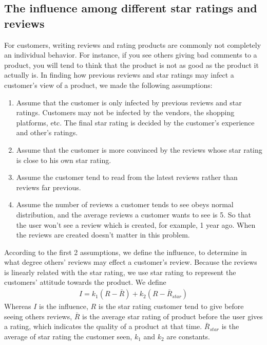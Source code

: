 \documentclass[12pt]{article}  %
\begin{document}
\subsection{The influence among different star ratings and reviews}
\label{sec:The influence among different star ratings and reviews}

For customers, writing reviews and rating products are commonly not completely an individual behavior. For instance, if you see others giving bad comments to a product, you will tend to think that the product is not as good as the product it actually is. In finding how previous reviews and star ratings may infect a customer's view of a product, we made the following assumptions:

\begin{enumerate}[\bfseries 1.]
\item Assume that the customer is only infected by previous reviews and star ratings. Customers may not be infected by the vendors, the shopping platforms, etc. The final star rating is decided by the customer's experience and other's ratings.
\item Assume that the customer is more convinced by the reviews whose star rating is close to his own star rating.
\item Assume the customer tend to read from the latest reviews rather than reviews far previous.
\item Assume the number of reviews a customer tends to see obeys normal distribution, and the average reviews a customer wants to see is 5. So that the user won't see a review which is created, for example, 1 year ago. When the reviews are created doesn't matter in this problem.
\end{enumerate}

According to the first 2 assumptions, we define the influence, to determine in what degree others' reviews may effect a customer's review. Because the reviews is linearly related with the star rating, we use star rating to represent the customers' attitude towards the product. We define
\begin{equation*}
  \begin{aligned}
    I = k_1 (R - \bar{R}) + k_2 (R - \bar{R}_{star})
  \end{aligned}
\end{equation*}
Whereas $I$ is the influence, $R$ is the star rating customer tend to give before seeing others reviews, $\bar{R}$ is the average star rating of product before the user gives a rating, which indicates the quality of a product at that time. $\bar{R}_{star}$ is the average of star rating the customer seen, $k_1$ and $k_2$ are constants.
\end{document}
